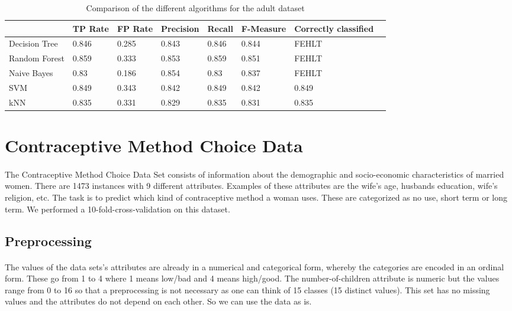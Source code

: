 \documentclass[paper=a4, fontsize=11pt]{scrartcl} %
\numberwithin{equation}{section} %
\numberwithin{figure}{section} %
\numberwithin{table}{section} %
\begin{document}
\begin{table}[h]
\centering
\begin{tabular}{llllllll}
	\toprule
									&TP Rate   	&FP Rate   &Precision &Recall  &F-Measure   &  Correctly classified\\
	\midrule
	Decision Tree		&  0.846   	& 0.285   	& 0.843   & 0.846  &  0.844 		& FEHLT\\
  Random Forest		&  0.859   	& 0.333   	& 0.853   & 0.859  & 0.851     	& FEHLT\\
  Naive Bayes		 	&  0.83    	& 0.186   	& 0.854   & 0.83   & 0.837     	& FEHLT\\
  SVM							& 0.849    	& 0.343     &0.842   	&0.849   &0.842     	& 0.849\\
  kNN							&0.835     	&0.331      &0.829    &0.835   &0.831				& 0.835\\
	\bottomrule
\end{tabular}
\caption{Comparison of the different algorithms for the adult dataset}
\end{table}





\section{Contraceptive Method Choice Data}

\paragraph{}The Contraceptive Method Choice Data Set consists of information about the demographic and socio-economic characteristics of married women. There are 1473 instances with 9 different attributes. Examples of these attributes are the wife's age, husbands education, wife's religion, etc. The task is to predict which kind of contraceptive method a woman uses. These are categorized as no use, short term or long term. We performed a 10-fold-cross-validation on this dataset.

\subsection{Preprocessing}

\paragraph{}The values of the data sets's attributes are already in a numerical and categorical form, whereby the categories are encoded in an ordinal form. These go from 1 to 4 where 1 means low/bad and 4 means high/good. The number-of-children attribute is numeric but the values range from 0 to 16 so that a preprocessing is not necessary as one can think of 15 classes (15 distinct values). This set has no missing values and the attributes do not depend on each other. So we can use the data as is.
\end{document}

